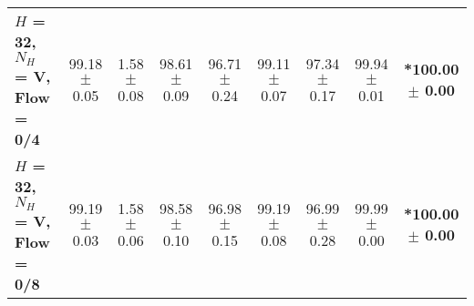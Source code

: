 \begin{table*}[ht]
{\begin{tabular}{lcccccccc}
        \textbf{$H$ = 32, $N_H$ = V, Flow = 0/4} & 99.18 $\pm$ 0.05 & 1.58 $\pm$ 0.08 & 98.61 $\pm$ 0.09 & 96.71 $\pm$ 0.24 & 99.11 $\pm$ 0.07 & 97.34 $\pm$ 0.17 & 99.94 $\pm$ 0.01 & \textbf{*100.00 $\pm$ 0.00} \\
        \textbf{$H$ = 32, $N_H$ = V, Flow = 0/8} & 99.19 $\pm$ 0.03 & 1.58 $\pm$ 0.06 & 98.58 $\pm$ 0.10 & 96.98 $\pm$ 0.15 & 99.19 $\pm$ 0.08 & 96.99 $\pm$ 0.28 & 99.99 $\pm$ 0.00 & \textbf{*100.00 $\pm$ 0.00} \\
        \bottomrule
    \end{tabular}
    }
\end{table*}

